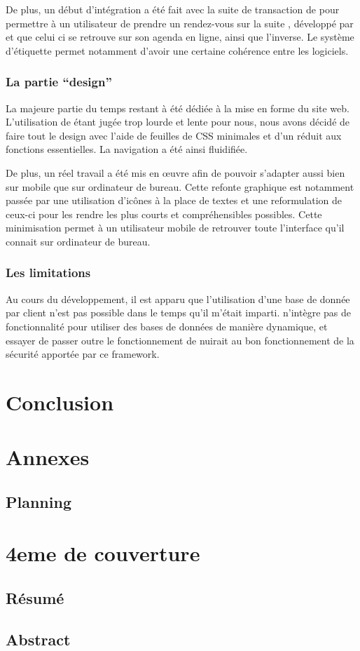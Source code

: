 \documentclass[a4paper, 11pt]{report}
\begin{document}
    De plus, un début d'intégration a été fait avec la suite de transaction de \logilink pour permettre à un utilisateur de prendre un rendez-vous sur la suite \ulti, développé par \logilink et que celui ci se retrouve sur son agenda en ligne, ainsi que l'inverse. Le système d'étiquette permet notamment d'avoir une certaine cohérence entre les logiciels.

    \section{La partie ``design''}
    La majeure partie du temps restant à été dédiée à la mise en forme du site web. L'utilisation de \bootstrap étant jugée trop lourde et lente pour nous, nous avons décidé de faire tout le design avec l'aide de feuilles de CSS minimales et d'un \javascript réduit aux fonctions essentielles. La navigation a été ainsi fluidifiée.

    De plus, un réel travail a été mis en œuvre afin de pouvoir s'adapter aussi bien sur mobile que sur ordinateur de bureau. Cette refonte graphique est notamment passée par une utilisation d’icônes à la place de textes et une reformulation de ceux-ci pour les rendre les plus courts et compréhensibles possibles. Cette minimisation permet à un utilisateur mobile de retrouver toute l'interface qu'il connait sur ordinateur de bureau.

    \section{Les limitations}
    Au cours du développement, il est apparu que l'utilisation d'une base de donnée par client n'est pas possible dans le temps qu'il m'était imparti. \symfony n'intègre pas de fonctionnalité pour utiliser des bases de données de manière dynamique, et essayer de passer outre le fonctionnement de \symfony nuirait au bon fonctionnement de la sécurité apportée par ce framework.
\part{Conclusion}

\part{Annexes}
\begin{appendix}
    \chapter{Planning}
\end{appendix}

\part{4eme de couverture}
\chapter{Résumé}
\chapter{Abstract}
\end{document}

